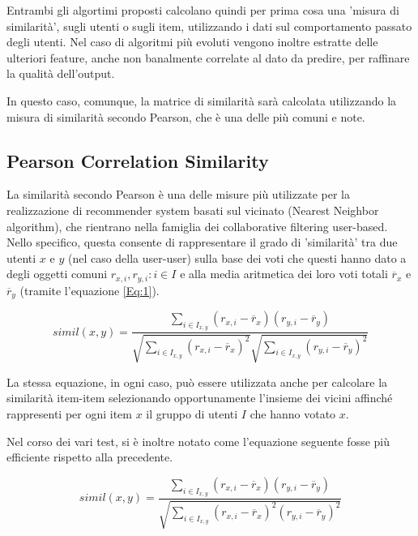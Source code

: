 \documentclass[12pt]{article}
\begin{document}
Entrambi gli algortimi proposti calcolano quindi per prima cosa  una 'misura di similarità', sugli utenti o sugli item, utilizzando i dati sul comportamento passato degli utenti. Nel caso di algoritmi più evoluti vengono inoltre estratte delle ulteriori feature, anche non banalmente correlate al dato da predire, per raffinare la qualità dell'output.

In questo caso, comunque, la matrice di similarità sarà calcolata utilizzando la misura di similarità secondo Pearson, che è una delle più comuni e note.

\subsection{Pearson Correlation Similarity}
\label{sec:Pearson Correlation Similarity}

La similarità secondo Pearson è una delle misure più utilizzate per la realizzazione di recommender system basati sul vicinato (Nearest Neighbor algorithm), che rientrano nella famiglia dei collaborative filtering user-based. Nello specifico, questa consente di rappresentare il grado di 'similarità' tra due utenti $x$ e $y$ (nel caso della user-user) sulla base dei voti che questi hanno dato a degli oggetti comuni $r_{x,i},r_{y,i}  : i \in I$ e alla media aritmetica dei loro voti totali $\overline{r}_{x}$ e $\overline{r}_{y}$ (tramite l'equazione \ref{Eq:1}).


\begin{equation}
simil(x,y) = \frac{\sum_{i \in I_{x,y}}(r_{x,i}-\overline{r}_{x})(r_{y,i}-\overline{r}_{y})}{\sqrt{\sum_{i \in I_{x,y}}(r_{x,i}-\overline{r}_{x})^2}\sqrt{\sum_{i \in I_{x,y}}(r_{y,i}-\overline{r}_{y})^2}}
\label{Eq:1}
\end{equation}

La stessa equazione, in ogni caso, può essere utilizzata anche per calcolare la similarità item-item selezionando opportunamente l'insieme dei vicini affinché rappresenti per ogni item $x$ il gruppo di utenti $I$ che hanno votato $x$.

Nel corso dei vari test, si è inoltre notato come l'equazione seguente fosse più efficiente rispetto alla precedente.

\begin{equation}
simil(x,y) = \frac{\sum_{i \in I_{x,y}}(r_{x,i}-\overline{r}_{x})(r_{y,i}-\overline{r}_{y})}{\sqrt{\sum_{i \in I_{x,y}}(r_{x,i}-\overline{r}_{x})^2(r_{y,i}-\overline{r}_{y})^2}}
\label{Eq:2}
\end{equation}
\end{document}

